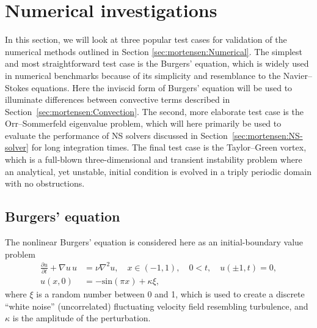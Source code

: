 \section{Numerical investigations}
\label{sec:mortensen:testcases}

In this section, we will look at three popular test cases for
validation of the numerical methods outlined in Section
\ref{sec:mortensen:Numerical}. The simplest and most straightforward
test case is the Burgers' equation, which is widely used in numerical
benchmarks because of its simplicity and resemblance to the
Navier--Stokes equations. Here the inviscid form of Burgers' equation
will be used to illuminate differences between convective terms
described in Section~\ref{sec:mortensen:Convection}. The second, more
elaborate test case is the Orr--Sommerfeld eigenvalue problem, which
will here primarily be used to evaluate the performance of NS solvers
discussed in Section~\ref{sec:mortensen:NS-solver} for long
integration times. The final test case is the Taylor--Green vortex,
which is a full-blown three-dimensional and transient instability
problem where an analytical, yet unstable, initial condition is
evolved in a triply periodic domain with no obstructions.

\subsection{Burgers' equation}
\label{sec:mortensen:burgers}

The nonlinear Burgers' equation is considered here as an
initial-boundary value problem
\begin{align}
 \frac{\partial u}{\partial t}+\nabla u \, u
  &= \nu \nabla^2 u, \quad x \in (-1,1), \quad 0<t, \quad u(\pm 1,t)=0,
\\
 u(x,0) &=-\text{sin}(\pi x)+\kappa \xi,
\label{eq:mortensen:burgers}
\end{align}
where $\xi$ is a random number between 0 and 1, which is used to
create a discrete ``white noise'' (uncorrelated) fluctuating velocity
field resembling turbulence, and $\kappa$ is the amplitude of the
perturbation.

